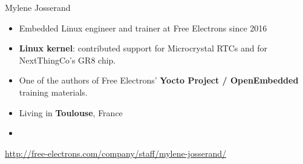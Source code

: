 \begin{frame}{Mylene Josserand}
    \begin{itemize}
	\item Embedded Linux engineer and trainer at Free Electrons since 2016
	\item {\bf Linux kernel}: contributed support for Microcrystal RTCs
	      and for NextThingCo's GR8 chip.
	\item One of the authors of Free Electrons' {\bf Yocto Project / OpenEmbedded}
	      training materials.
	\item Living in {\bf Toulouse}, France
	\item {}
    \end{itemize}
    {\small \url{http://free-electrons.com/company/staff/mylene-josserand/}}
\end{frame}
